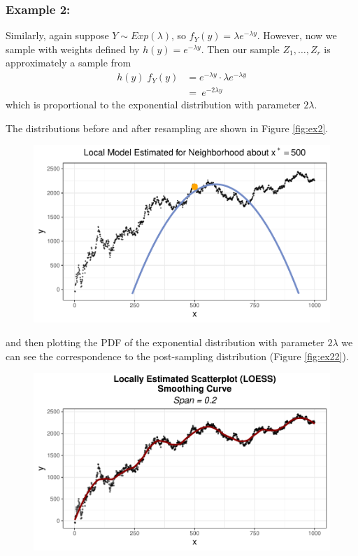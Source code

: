 \documentclass[12pt,twoside]{smiththesis}
\begin{document}
\hypertarget{example-2}{%
\subsubsection{Example 2:}\label{example-2}}

Similarly, again suppose \(Y \sim Exp(\lambda)\), so \(f_Y(y) = \lambda e^{-\lambda y}\). However, now we sample with weights defined by \(h(y)= e^{-\lambda y}\).
Then our sample \(Z_1,\dots,Z_r\) is approximately a sample from
\begin{align*} 
h(y) \; f_Y(y) &=   e^{-\lambda y} \cdot \lambda e^{-\lambda y}\\
&= \ e^{-2 \lambda y}  
\end{align*}
which is proportional to the exponential distribution with parameter \(2\lambda\).

The distributions before and after resampling are shown in Figure \ref{fig:ex2}.
\begin{figure}

{\centering \includegraphics{thesis_files/figure-latex/unnamed-chunk-23-1} 

}

\caption{\label{fig:ex2}}\label{fig:unnamed-chunk-23}
\end{figure}
and then plotting the PDF of the exponential distribution with parameter \(2\lambda\) we can see the correspondence to the post-sampling distribution (Figure \ref{fig:ex22}).
\begin{figure}

{\centering \includegraphics{thesis_files/figure-latex/unnamed-chunk-24-1} 

}

\caption{\label{fig:ex22}}\label{fig:unnamed-chunk-24}
\end{figure}
\end{document}
